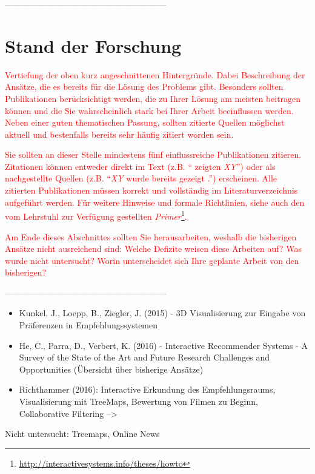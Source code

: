 \documentclass[ngerman, a4paper, abstract=false, twoside=false, parskip=half, DIV=12, bibtotoc]{scrartcl}
\begin{document}
---------------------------------------------------------
\section{Stand der Forschung}
\textcolor{red}{Vertiefung der oben kurz angeschnittenen Hintergründe. Dabei Beschreibung der Ansätze, die es bereits für die Lösung des Problems gibt. Besonders sollten Publikationen berücksichtigt werden, die zu Ihrer Lösung am meisten beitragen können und die Sie wahrscheinlich stark bei Ihrer Arbeit beeinflussen werden. Neben einer guten thematischen Passung, sollten zitierte Quellen möglichst aktuell und bestenfalls bereits sehr häufig zitiert worden sein.}

\textcolor{red}{Sie sollten an dieser Stelle mindestens fünf einflussreiche Publikationen zitieren. Zitationen können entweder direkt im Text (z.B. \enquote{\citet{Zobel:2004} zeigten \emph{XY}}) oder als nachgestellte Quellen (z.B. \enquote{\emph{XY} wurde bereits gezeigt \citep{Zobel:2004}.}) erscheinen. Alle zitierten Publikationen müssen korrekt und vollständig im Literaturverzeichnis aufgeführt werden. Für weitere Hinweise und formale Richtlinien, siehe auch den vom Lehrstuhl zur Verfügung gestellten \emph{Primer}\footnote{\url{http://interactivesystems.info/theses/howto}}.}

\textcolor{red}{Am Ende dieses Abschnittes sollten Sie herausarbeiten, weshalb die bisherigen Ansätze nicht ausreichend sind: Welche Defizite weisen diese Arbeiten auf? Was wurde nicht untersucht? Worin unterscheidet sich Ihre geplante Arbeit von den bisherigen?}

---------------------------------------------------------

\begin{itemize}
\item  Kunkel, J., Loepp, B., Ziegler, J. (2015) - 3D Visualisierung zur Eingabe von Präferenzen in Empfehlungssystemen
\item He, C., Parra, D., Verbert, K. (2016) - Interactive Recommender Systems - A Survey of the State of the Art and Future Research Challenges and Opportunities (Übersicht über bisherige Ansätze)
\item Richthammer (2016): Interactive Erkundung des Empfehlungsraums, Visualisierung mit TreeMaps, Bewertung von Filmen zu Beginn, Collaborative Filtering --> 
\end{itemize}


Nicht untersucht: Treemaps, Online News
\end{document}
